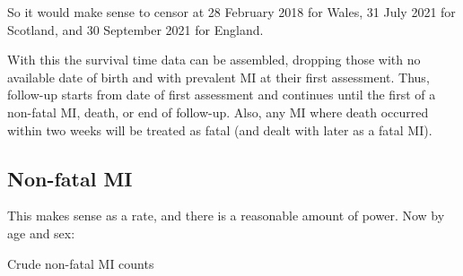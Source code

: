 \documentclass[11pt]{article}
\begin{document}
So it would make sense to censor at 28 February 2018 for Wales, 31 July 2021 for Scotland, and 30 September 2021 for England. 

With this the survival time data can be assembled, dropping those with no available date of birth and with prevalent MI at
their first assessment. Thus, follow-up starts from date of first assessment and continues until the first of a non-fatal MI, 
death, or end of follow-up. Also, any MI where death occurred within two weeks will be treated as fatal 
(and dealt with later as a fatal MI).

\subsection{Non-fatal MI} 

\color{Blue4}
\begin{stlog}\end{stlog}
\begin{stlog}\end{stlog}
\color{black}

This makes sense as a rate, and there is a reasonable amount of power.
Now by age and sex: 

\color{Blue4}
\begin{stlog}\end{stlog}
\color{black}

\begin{table}[h!]
  \begin{center}
    \caption{Crude non-fatal MI counts}
    \label{MItable}
  \end{center}
\end{table}
\end{document}
